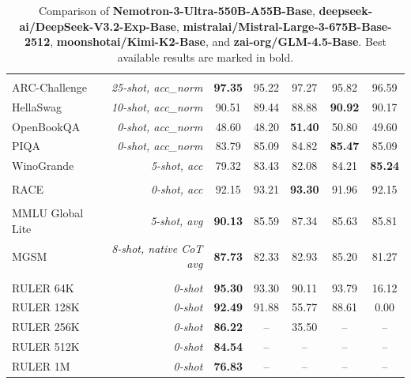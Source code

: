 \begin{table}[ht!]
{\begin{tabular}{lr|ccccc}
\rowcolor{black!5}
\multicolumn{7}{l}{\textbf{Commonsense Understanding}} \\
ARC-Challenge & \textit{25-shot, acc\_norm} & \textbf{97.35} & 95.22 & 97.27 & 95.82 & 96.59 \\
HellaSwag & \textit{10-shot, acc\_norm} & 90.51 & 89.44 & 88.88 & \textbf{90.92} & 90.17 \\
OpenBookQA & \textit{0-shot, acc\_norm} & 48.60 & 48.20 & \textbf{51.40} & 50.80 & 49.60 \\
PIQA & \textit{0-shot, acc\_norm} & 83.79 & 85.09 & 84.82 & \textbf{85.47} & 85.09 \\
WinoGrande & \textit{5-shot, acc} & 79.32 & 83.43 & 82.08 & 84.21 & \textbf{85.24} \\
\midrule

\rowcolor{black!5}
\multicolumn{7}{l}{\textbf{Reading Comprehension}} \\
RACE & \textit{0-shot, acc} & 92.15 & 93.21 & \textbf{93.30} & 91.96 & 92.15 \\
\midrule

\rowcolor{black!5}
\multicolumn{7}{l}{\textbf{Multilingual}} \\
MMLU Global Lite & \textit{5-shot, avg} & \textbf{90.13} & 85.59 & 87.34 & 85.63 & 85.81 \\
MGSM & \textit{8-shot, native CoT avg} & \textbf{87.73} & 82.33 & 82.93 & 85.20 & 81.27 \\
\midrule

\rowcolor{black!5}
\multicolumn{7}{l}{\textbf{Long Context}} \\
RULER 64K & \textit{0-shot} & \textbf{95.30} & 93.30 & 90.11 & 93.79 & 16.12 \\
RULER 128K & \textit{0-shot} & \textbf{92.49} & 91.88 & 55.77 & 88.61 & 0.00 \\
RULER 256K & \textit{0-shot} & \textbf{86.22} & -- & 35.50 & -- & -- \\
RULER 512K & \textit{0-shot} & \textbf{84.54} & -- & -- & -- & -- \\
RULER 1M & \textit{0-shot} & \textbf{76.83} & -- & -- & -- & -- \\
\bottomrule
\end{tabular}%
}
\caption[Base model comparison]{
    Comparison of \textbf{Nemotron-3-Ultra-550B-A55B-Base}, \textbf{deepseek-ai/DeepSeek-V3.2-Exp-Base}, \textbf{mistralai/Mistral-Large-3-675B-Base-2512}, \textbf{moonshotai/Kimi-K2-Base}, and \textbf{zai-org/GLM-4.5-Base}. Best available results are marked in bold.
}
\label{tab:base-model-comparison}
\end{table}

